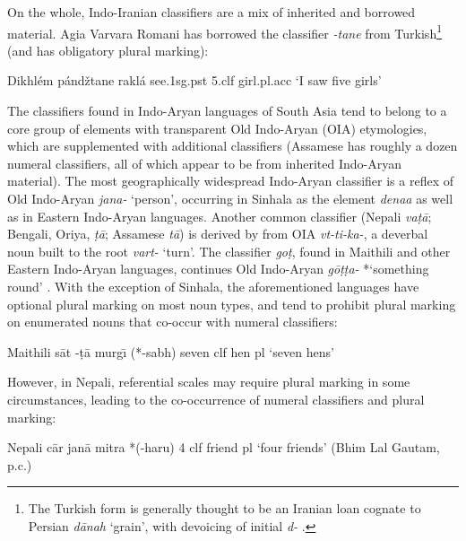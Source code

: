 \documentclass[11pt]{article}
\begin{document}
On the whole, Indo-Iranian classifiers are a mix of inherited and borrowed material. 
Agia Varvara Romani has borrowed the classifier {\it -tane} from Turkish\footnote{The Turkish form is generally thought to be an Iranian loan cognate to Persian {\it d\=anah} `grain', with devoicing of initial {\it d-} \citep[138]{Stilo2018}.} (and has obligatory plural marking):
\begin{example}
\gll Dikhl\'em p\'and\v{z}tane rakl\'a
see.1{\sc sg.pst} 5.{\sc clf} girl.{\sc pl.acc}
\glt `I saw five girls' \citep[45]{Igla1996}
\glend
\end{example}
The classifiers found in Indo-Aryan languages of South Asia tend to belong to a core group of elements with transparent Old Indo-Aryan (OIA) etymologies, which are supplemented with additional classifiers (Assamese has roughly a dozen numeral classifiers, all of which appear to be from inherited Indo-Aryan material). 
The most geographically widespread Indo-Aryan classifier is a reflex of Old Indo-Aryan {\it jana-} `person', occurring in Sinhala as the element {\it denaa} \citep[4]{Geiger1942} as well as in Eastern Indo-Aryan languages. 
Another common classifier (Nepali {\it va\d{t}\=a}; Bengali, Oriya, {\it \d{t}\=a}; Assamese {\it t\=a}) is derived by \citet[684ff.]{Chatterji1926} from OIA {\it vt-ti-ka-}, a deverbal noun built to the root {\it vart-} `turn'.
The classifier {\it go\d{t}}, found in Maithili and other Eastern Indo-Aryan languages, continues Old Indo-Aryan {\it g\={o}\d{t}\d{t}a-} *`something round' \citep[229]{Turner1962}. 
With the exception of Sinhala, the aforementioned languages have optional plural marking on most noun types, and tend to prohibit plural marking on enumerated nouns that co-occur with numeral classifiers:
\begin{example} Maithili
\gll s\=at -\d{t}\=a murg\={\i} (*-sabh)
seven {\sc clf} hen {\sc pl}
\glt `seven hens' \citep[117]{Burghart1992}
\glend
\end{example}
However, in Nepali, referential scales may require plural marking in some circumstances, leading to the co-occurrence of numeral classifiers and plural marking:
\begin{example} Nepali
\gll c\=ar jan\=a mitra *(-haru)
4 {\sc clf} friend {\sc pl}
\glt `four friends' (Bhim Lal Gautam, p.c.)
\glend
\end{example}
\end{document}

